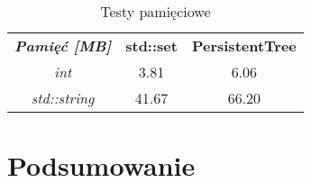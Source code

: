 \documentclass[a4paper,twoside]{article}
\begin{document}
	\begin{table}[h]
		\centering
		\caption{Testy pamięciowe}
		\begin{tabular}{c|c|l|l|c|l|l|}
			\cline{2-7}
			\multirow{2}{*}{\textit{\textbf{Pamięć {[}MB{]}}}} & \multicolumn{3}{c|}{\multirow{2}{*}{\textbf{std::set}}} & \multicolumn{3}{c|}{\multirow{2}{*}{\textbf{PersistentTree}}} \\
			& \multicolumn{3}{c|}{}                                   & \multicolumn{3}{c|}{}                                         \\ \hline
			\multicolumn{1}{|c|}{\textit{int}}                 & \multicolumn{3}{c|}{3.81}                               & \multicolumn{3}{c|}{6.06}                                     \\ \hline
			\multicolumn{1}{|c|}{\textit{std::string}}         & \multicolumn{3}{c|}{41.67}                              & \multicolumn{3}{c|}{66.20}                                    \\ \hline
		\end{tabular}
	\end{table}
	
	\section{Podsumowanie}
	
	
\end{document}
